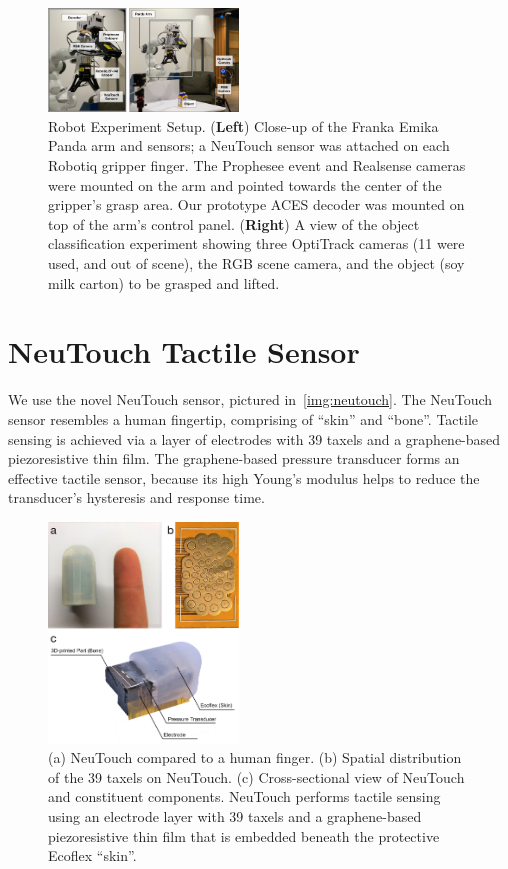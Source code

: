 \documentclass[fyp]{socreport}
\begin{document}
\begin{figure}
  \centering
  \includegraphics[width=0.45\textwidth]{images/robotsetup/robot_setup_wsensors.pdf}
  \caption{Robot Experiment Setup. (\textbf{Left}) Close-up of the Franka Emika
    Panda arm and sensors; a NeuTouch sensor was attached on each Robotiq
    gripper finger. The Prophesee event and Realsense cameras were mounted on
    the arm and pointed towards the center of the gripper's grasp area. Our
    prototype ACES decoder was mounted on top of the arm's control panel.
    (\textbf{Right}) A view of the object classification experiment showing
    three OptiTrack cameras (11 were used, and out of scene), the RGB scene
    camera, and the object (soy milk carton) to be grasped and
    lifted.\label{fig:robotsetup}}
\end{figure}

\section{NeuTouch Tactile Sensor}
We use the novel NeuTouch sensor, pictured in~\autoref{img:neutouch}. The
NeuTouch sensor resembles a human fingertip, comprising of ``skin'' and
``bone''. Tactile sensing is achieved via a layer of electrodes with 39 taxels
and a graphene-based piezoresistive thin film. The graphene-based pressure
transducer forms an effective tactile sensor, because its high Young's modulus
helps to reduce the transducer's hysteresis and response time.

\begin{figure}
\centering
\includegraphics[width=0.45\textwidth]{images/spktac}
\caption{(a) NeuTouch compared to a human finger. (b) Spatial distribution of
  the 39 taxels on NeuTouch. (c) Cross-sectional view of NeuTouch and
  constituent components. NeuTouch performs tactile sensing using an electrode
  layer with 39 taxels and a graphene-based piezoresistive thin film that is
  embedded beneath the protective Ecoflex ``skin''.\label{img:neutouch}}
\end{figure}
\end{document}
